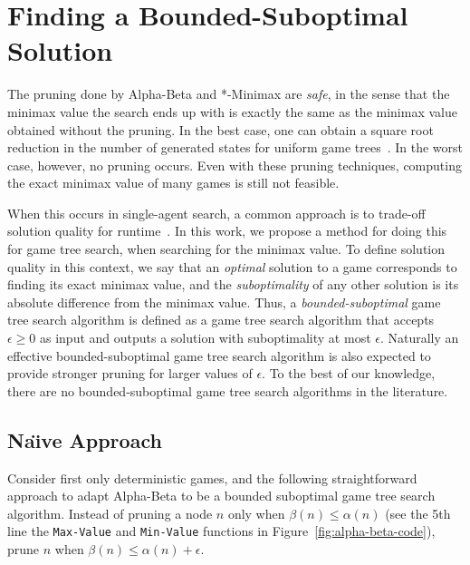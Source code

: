 \documentclass[letterpaper]{article} %
\begin{document}
 



\section{Finding a Bounded-Suboptimal Solution}

The pruning done by Alpha-Beta and *-Minimax are \emph{safe}, in the sense that the minimax value the search ends up with is exactly the same as the minimax value obtained without the pruning. In the best case, one can obtain a square root reduction in the number of generated states for uniform game trees~\cite{knuth1975analysis,ballard1983minimax}. In the worst case, however, no pruning occurs. Even with these pruning techniques, computing the exact minimax value of many games is still not feasible. %

When this occurs in single-agent search, a common approach is to trade-off solution quality for runtime~\cite{pohl1970heuristic,thayer2011bounded,gilon2016dynamic}. 
In this work, we propose a method for doing this for game tree search, when searching for the minimax value. 
To define solution quality in this context, we say that an  \emph{optimal} solution to a game corresponds to finding its exact minimax value, and the \emph{suboptimality} of any other solution is its absolute difference from the minimax value. %
Thus, a \emph{bounded-suboptimal} game tree search algorithm is defined as a game tree search algorithm that accepts $\epsilon \geq 0$ as input and outputs a solution with suboptimality at most $\epsilon$. 
Naturally an effective bounded-suboptimal game tree search algorithm is also expected to provide stronger pruning for larger values of $\epsilon$.
To the best of our knowledge, there are no bounded-suboptimal game tree search algorithms in the literature. 

\subsection{Na\"{\i}ve Approach}
Consider first only deterministic games, and the following straightforward approach to adapt Alpha-Beta to be a bounded suboptimal game tree search algorithm.
Instead of pruning a node $n$ only when $\beta(n) \leq \alpha(n)$ (see the 5th line the \texttt{Max-Value} and \texttt{Min-Value} functions in Figure~\ref{fig:alpha-beta-code}), prune $n$  when $\beta(n) \leq \alpha(n) +\epsilon$. 
\end{document}
